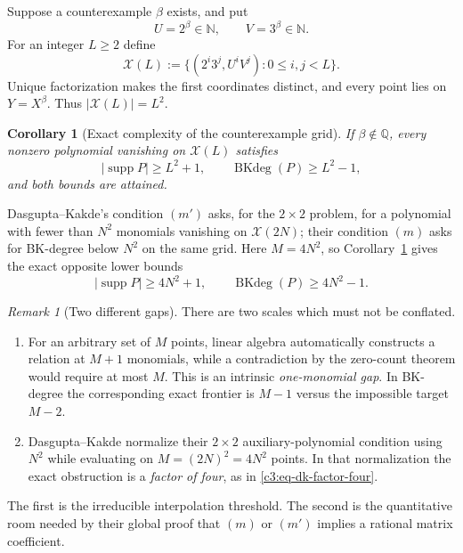 \documentclass[11pt,oneside]{article}
\newtheorem{corollary}[theorem]{Corollary}
\theoremstyle{definition}
\theoremstyle{remark}
\newtheorem{remark}[theorem]{Remark}
\newcommand{\N}{\mathbb N}
\newcommand{\Q}{\mathbb Q}
\newcommand{\supp}{\operatorname{supp}}
\newcommand{\BKd}{\operatorname{BKdeg}}
\begin{document}
Suppose a counterexample $\beta$ exists, and put
\[
 U=2^\beta\in\N,
 \qquad
 V=3^\beta\in\N.
\]
For an integer $L\ge2$ define
\begin{equation}
 \mathcal X(L):=
 \{(2^i3^j,U^iV^j):0\le i,j<L\}.
 \label{c3:eq-grid}
\end{equation}
Unique factorization makes the first coordinates distinct, and every point lies on
$Y=X^\beta$.  Thus $|\mathcal X(L)|=L^2$.

\begin{corollary}[Exact complexity of the counterexample grid]
\label{c3:cor-grid-complexity}
If $\beta\notin\Q$, every nonzero polynomial vanishing on $\mathcal X(L)$ satisfies
\[
 |\supp P|\ge L^2+1,
 \qquad
 \BKd(P)\ge L^2-1,
\]
and both bounds are attained.
\end{corollary}

Dasgupta--Kakde's condition $(m')$ asks, for the $2\times2$ problem, for a polynomial with
fewer than $N^2$ monomials vanishing on $\mathcal X(2N)$; their condition $(m)$ asks for
BK-degree below $N^2$ on the same grid.  Here $M=4N^2$, so
Corollary~\ref{c3:cor-grid-complexity} gives the exact opposite lower bounds
\begin{equation}
 |\supp P|\ge4N^2+1,
 \qquad
 \BKd(P)\ge4N^2-1.
 \label{c3:eq-dk-factor-four}
\end{equation}

\begin{remark}[Two different gaps]
There are two scales which must not be conflated.
\begin{enumerate}
\item For an arbitrary set of $M$ points, linear algebra automatically constructs a relation
      at $M+1$ monomials, while a contradiction by the zero-count theorem would require at
      most $M$.  This is an intrinsic \emph{one-monomial gap}.  In BK-degree the corresponding
      exact frontier is $M-1$ versus the impossible target $M-2$.
\item Dasgupta--Kakde normalize their $2\times2$ auxiliary-polynomial condition using
      $N^2$ while evaluating on $M=(2N)^2=4N^2$ points.  In that normalization the exact
      obstruction is a \emph{factor of four}, as in \eqref{c3:eq-dk-factor-four}.
\end{enumerate}
The first is the irreducible interpolation threshold.  The second is the quantitative room
needed by their global proof that $(m)$ or $(m')$ implies a rational matrix coefficient.
\end{remark}
\end{document}
